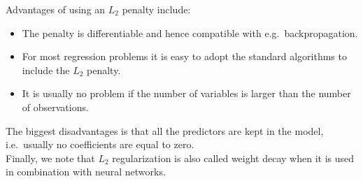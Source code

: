 Advantages of using an $L_2$ penalty include:
\begin{itemize}
\item The penalty is differentiable and hence compatible with e.g.\ backpropagation.
\item For most regression problems it is easy to adopt the standard algorithms to include the $L_2$ penalty.
\item It is usually no problem if the number of variables is larger than the number of observations.
\end{itemize}
The biggest disadvantages is that all the predictors are kept in the model, i.e.\ usually no coefficients are equal to zero. \\

Finally, we note that $L_2$ regularization is also called weight decay when it is used in combination with neural networks. 

